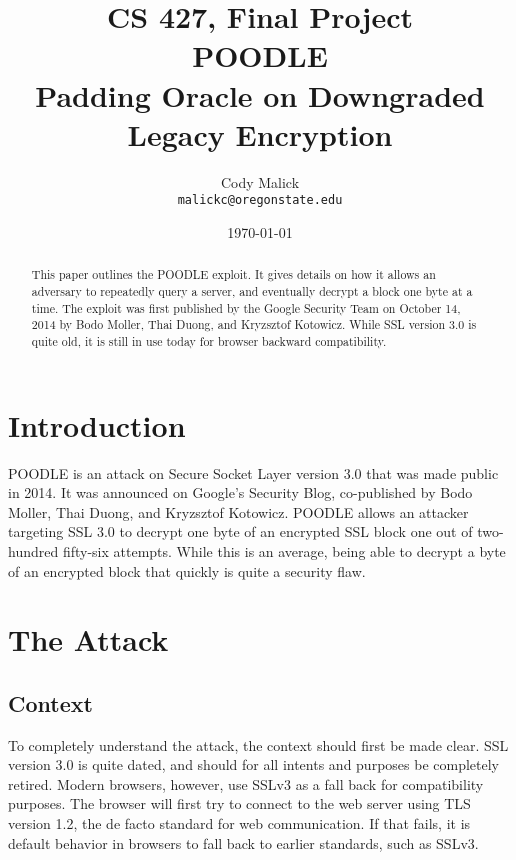 \documentclass[10pt]{article}
\begin{document}
\title{CS 427, Final Project\\ POODLE\\ Padding Oracle on Downgraded Legacy
Encryption}
\author{Cody Malick\\
\texttt{malickc@oregonstate.edu}}
\date{\today}
\maketitle
\vspace{4cm}

\begin{abstract}
	This paper outlines the POODLE exploit. It gives details on how it
	allows an adversary to repeatedly query a server, and eventually decrypt
	a block one byte at a time. The exploit was first published by the
	Google Security Team on October 14, 2014 by Bodo Moller, Thai Duong,
	and Kryzsztof Kotowicz. While SSL version 3.0 is quite old, it is still
	in use today for browser backward compatibility. 

\end{abstract}

\clearpage

\section*{Introduction}
POODLE is an attack on Secure Socket Layer version 3.0 that was made public
in 2014. It was announced on Google's Security Blog, co-published by Bodo Moller,
Thai Duong, and Kryzsztof Kotowicz. POODLE allows an attacker targeting SSL 3.0
to decrypt one byte of an encrypted SSL block one out of two-hundred fifty-six 
attempts. While this is an average, being able to decrypt a byte of an encrypted
block that quickly is quite a security flaw.\cite{POODLE}

\section*{The Attack}
\subsection*{Context}
To completely understand the attack, the context should first be made clear. 
SSL version 3.0 is quite dated, and should for all intents and purposes be 
completely retired. Modern browsers, however, use SSLv3 as a fall back for
compatibility purposes. The browser will first try to connect to the web server
using TLS version 1.2, the de facto standard for web communication. If that fails, it is
default behavior in browsers to fall back to earlier standards, such as SSLv3.\cite{POODLE}
\end{document}
